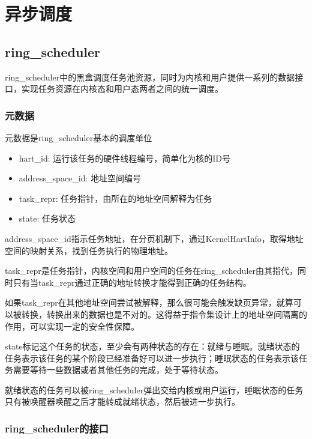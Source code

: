 \section{异步调度}

\subsection{ring\_scheduler}


ring\_scheduler中的黑盒调度任务池资源，同时为内核和用户提供一系列的数据接口，实现任务资源在内核态和用户态两者之间的统一调度。

\subsubsection{元数据}

元数据是ring\_scheduler基本的调度单位

\begin{itemize}
\item hart\_id: 运行该任务的硬件线程编号，简单化为核的ID号
\item address\_space\_id: 地址空间编号
\item task\_repr: 任务指针，由所在的地址空间解释为任务
\item state: 任务状态
\end{itemize}


address\_space\_id指示任务地址，在分页机制下，通过KernelHartInfo，取得地址空间的映射关系，找到任务执行的物理地址。

task\_repr是任务指针，内核空间和用户空间的任务在ring\_scheduler由其指代，同时只有当task\_repr通过正确的地址转换才能得到正确的任务结构。

如果task\_repr在其他地址空间尝试被解释，那么很可能会触发缺页异常，就算可以被转换，转换出来的数据也是不对的。这得益于指令集设计上的地址空间隔离的作用，可以实现一定的安全性保障。


state标记这个任务的状态，至少会有两种状态的存在：就绪与睡眠。就绪状态的任务表示该任务的某个阶段已经准备好可以进一步执行；睡眠状态的任务表示该任务需要等待一些数据或者其他任务的完成，处于等待状态。

就绪状态的任务可以被ring\_scheduler弹出交给内核或用户运行，睡眠状态的任务只有被唤醒器唤醒之后才能转成就绪状态，然后被进一步执行。

\subsubsection{ring\_scheduler的接口}

